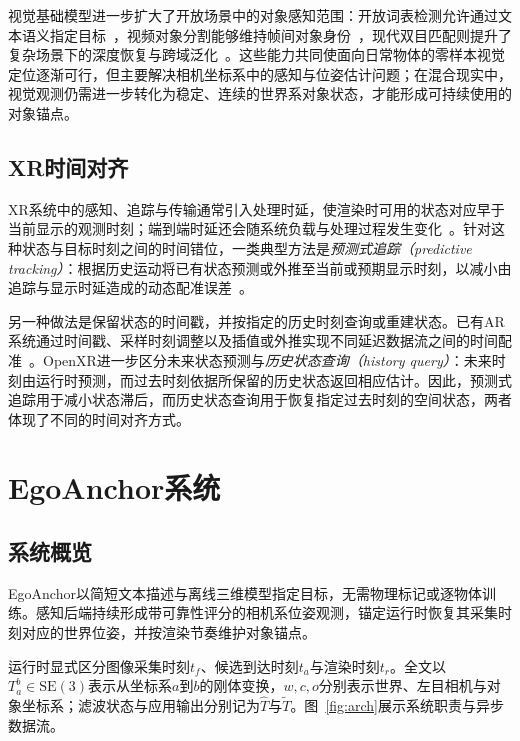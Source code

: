 \documentclass[review]{vgtc}
\begin{document}
视觉基础模型进一步扩大了开放场景中的对象感知范围：开放词表检测允许通过文本语义指定目标~\cite{owlvit2022,glip2022,groundingdino2025,yoloe2025}，视频对象分割能够维持帧间对象身份~\cite{xmem2022,cutie2024}，现代双目匹配则提升了复杂场景下的深度恢复与跨域泛化~\cite{raftstereo2021,igevstereo2023,fastfoundationstereo2026}。这些能力共同使面向日常物体的零样本视觉定位逐渐可行，但主要解决相机坐标系中的感知与位姿估计问题；在混合现实中，视觉观测仍需进一步转化为稳定、连续的世界系对象状态，才能形成可持续使用的对象锚点。

\subsection{XR时间对齐}

XR系统中的感知、追踪与传输通常引入处理时延，使渲染时可用的状态对应早于当前显示的观测时刻；端到端时延还会随系统负载与处理过程发生变化~\cite{diluca2010latency,mrloop2022,stauffert2020mtp}。针对这种状态与目标时刻之间的时间错位，一类典型方法是\emph{预测式追踪（predictive tracking）}：根据历史运动将已有状态预测或外推至当前或预期显示时刻，以减小由追踪与显示时延造成的动态配准误差~\cite{azuma1994improving,laviola2003double,pvt2023,yoon2022headmotion}。

另一种做法是保留状态的时间戳，并按指定的历史时刻查询或重建状态。已有AR系统通过时间戳、采样时刻调整以及插值或外推实现不同延迟数据流之间的时间配准~\cite{jacobs1997latency}。OpenXR进一步区分未来状态预测与\emph{历史状态查询（history query）}：未来时刻由运行时预测，而过去时刻依据所保留的历史状态返回相应估计。因此，预测式追踪用于减小状态滞后，而历史状态查询用于恢复指定过去时刻的空间状态，两者体现了不同的时间对齐方式。

\section{EgoAnchor系统}\label{sec:system}

\subsection{系统概览}

EgoAnchor以简短文本描述与离线三维模型指定目标，无需物理标记或逐物体训练。感知后端持续形成带可靠性评分的相机系位姿观测，锚定运行时恢复其采集时刻对应的世界位姿，并按渲染节奏维护对象锚点。

运行时显式区分图像采集时刻$t_f$、候选到达时刻$t_a$与渲染时刻$t_r$。全文以$T_a^b\in\mathrm{SE}(3)$表示从坐标系$a$到$b$的刚体变换，$w,c,o$分别表示世界、左目相机与对象坐标系；滤波状态与应用输出分别记为$\widehat{T}$与$\widetilde{T}$。图~\ref{fig:arch}展示系统职责与异步数据流。
\end{document}
